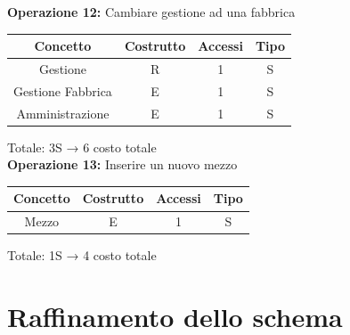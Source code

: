 \documentclass[a4paper,12pt]{report}
\begin{document}
\textbf{Operazione 12:}
Cambiare gestione ad una fabbrica\\
\begin{center}
    \begin{tabular}{ | c   c   c   c | } 
    \hline
	Concetto&Costrutto&Accessi&Tipo\\
	\hline
	Gestione&R&1&S\\
	\hline
    Gestione Fabbrica&E&1&S\\
	\hline
	Amministrazione&E&1&S\\
	\hline
	\end{tabular}
\end{center}
Totale: 3S → 6 costo totale\\
\textbf{Operazione 13:}
Inserire un nuovo mezzo\\
\begin{center}
    \begin{tabular}{ | c   c   c   c | } 
    \hline
	Concetto&Costrutto&Accessi&Tipo\\
	\hline
	Mezzo&E&1&S\\
	\hline
	\end{tabular}
\end{center}
Totale: 1S → 4 costo totale\\
\section{Raffinamento dello schema}
\end{document}
